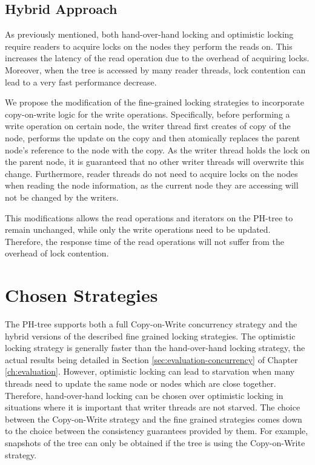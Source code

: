\documentclass[11pt,a4paper]{globis-book}
\begin{document}
\subsection{Hybrid Approach}
As previously mentioned, both hand-over-hand locking and optimistic locking require readers to acquire locks on the nodes they perform the reads on. This increases the latency of the read operation due to the overhead of acquiring locks. Moreover, when the tree is accessed by many reader threads, lock contention can lead to a very fast performance decrease. 

We propose the modification of the fine-grained locking strategies to incorporate copy-on-write logic for the write operations. Specifically, before performing a write operation on certain node, the writer thread first creates of copy of the node, performs the update on the copy and then atomically replaces the parent node's reference to the node with the copy. As the writer thread holds the lock on the parent node, it is guaranteed that no other writer threads will overwrite this change. Furthermore, reader threads do not need to acquire locks on the nodes when reading the node information, as the current node they are accessing will not be changed by the writers. 

This modifications allows the read operations and iterators on the PH-tree to remain unchanged, while only the write operations need to be updated. Therefore, the response time of the read operations will not suffer from the overhead of lock contention. 

\section{Chosen Strategies}
The PH-tree supports both a full Copy-on-Write concurrency strategy and the hybrid versions of the described fine grained locking strategies. The optimistic locking strategy is generally faster than the hand-over-hand locking strategy, the actual results being detailed in Section \ref{sec:evaluation-concurrency} of Chapter \ref{ch:evaluation}. However, optimistic locking can lead to starvation when many threads need to update the same node or nodes which are close together. Therefore, hand-over-hand locking can be chosen over optimistic locking in situations where it is important that writer threads are not starved. The choice between the Copy-on-Write strategy and the fine grained strategies comes down to the choice between the consistency guarantees provided by them. For example, snapshots of the tree can only be obtained if the tree is using the Copy-on-Write strategy. 
\end{document}
